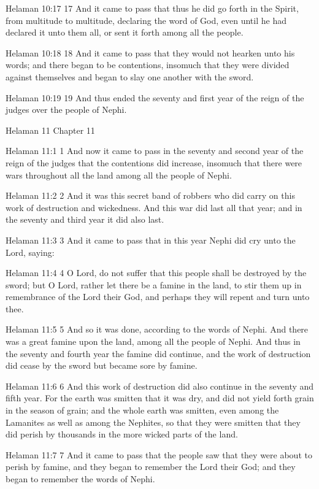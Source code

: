 Helaman 10:17
 17 And it came to pass that thus he did go forth in the Spirit,
from multitude to multitude, declaring the word of God, even
until he had declared it unto them all, or sent it forth among
all the people.

Helaman 10:18
 18 And it came to pass that they would not hearken unto his
words; and there began to be contentions, insomuch that they were
divided against themselves and began to slay one another with the
sword.

Helaman 10:19
 19 And thus ended the seventy and first year of the reign of the
judges over the people of Nephi.

Helaman 11
Chapter 11

Helaman 11:1
 1 And now it came to pass in the seventy and second year of the
reign of the judges that the contentions did increase, insomuch
that there were wars throughout all the land among all the people
of Nephi.

Helaman 11:2
 2 And it was this secret band of robbers who did carry on this
work of destruction and wickedness. And this war did last all
that year; and in the seventy and third year it did also last.

Helaman 11:3
 3 And it came to pass that in this year Nephi did cry unto the
Lord, saying:

Helaman 11:4
 4 O Lord, do not suffer that this people shall be destroyed by
the sword; but O Lord, rather let there be a famine in the land,
to stir them up in remembrance of the Lord their God, and perhaps
they will repent and turn unto thee.

Helaman 11:5
 5 And so it was done, according to the words of Nephi. And
there was a great famine upon the land, among all the people of
Nephi. And thus in the seventy and fourth year the famine did
continue, and the work of destruction did cease by the sword but
became sore by famine.

Helaman 11:6
 6 And this work of destruction did also continue in the seventy
and fifth year. For the earth was smitten that it was dry, and
did not yield forth grain in the season of grain; and the whole
earth was smitten, even among the Lamanites as well as among the
Nephites, so that they were smitten that they did perish by
thousands in the more wicked parts of the land.

Helaman 11:7
 7 And it came to pass that the people saw that they were about
to perish by famine, and they began to remember the Lord their
God; and they began to remember the words of Nephi.

